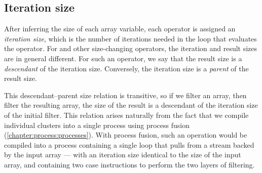 
% 

% 


\subsection{Iteration size}
After inferring the size of each array variable, each operator is assigned an \emph{iteration size}, which is the number of iterations needed in the loop that evaluates the operator.
For \Hs@filter@ and other size-changing operators, the iteration and result sizes are in general different.
For such an operator, we say that the result size is a \emph{descendant} of the iteration size.
Conversely, the iteration size is a \emph{parent} of the result size. 

This descendant--parent size relation is transitive, so if we filter an array, then filter the resulting array, the size of the result is a descendant of the iteration size of the initial filter.
This relation arises naturally from the fact that we compile individual clusters into a single process using process fusion (\cref{chapter:process:processes}).
With process fusion, such an operation would be compiled into a process containing a single loop that pulls from a stream backed by the input array --- with an iteration size identical to the size of the input array, and containing two case instructions to perform the two layers of filtering.

